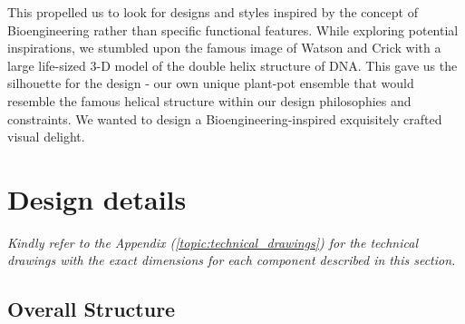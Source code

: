 \documentclass[12pt]{extarticle} %
\begin{document}
This propelled us to look for designs and styles inspired by the concept of Bioengineering rather than specific functional features. While exploring potential inspirations, we stumbled upon the famous image of Watson and Crick with a large life-sized 3-D model of the double helix structure of DNA. This gave us the silhouette for the design - our own unique plant-pot ensemble that would resemble the famous helical structure within our design philosophies and constraints. We wanted to design a Bioengineering-inspired exquisitely crafted visual delight. 
\pagebreak

\section{Design details}
\textit{Kindly refer to the Appendix (\ref{topic:technical_drawings}) for the technical drawings with the exact dimensions for each component described in this section.} 
\subsection{Overall Structure}
\end{document}
